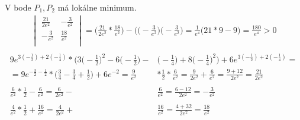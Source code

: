 \documentclass[a4paper]{article}
\begin{document}
		V bode $P_1, P_2$ má lokálne minimum.\\
		\begin{align*}
			\begin{vmatrix}
				\frac{21}{2e^2} & - \frac{3}{e^2}\\
				-\frac{3}{e^2} & \frac{18}{e^2}\\
			\end{vmatrix}
			= \bigg(\frac{21}{2e^2}*\frac{18}{e^2}\bigg) - \bigg(\bigg(- \frac{3}{e^2}\bigg)\bigg(- \frac{3}{e^2}\bigg) = \frac{1}{e^4}\bigg(21*9 - 9\bigg) = \frac{180}{e^4} > 0\\
		\end{align*}
		\begin{align*}
			9e^{3(-\frac{1}{2})+2(-\frac{1}{4})}*
			\bigg(3\bigg(-\frac{1}{2}\bigg)^2 - 6\bigg(-\frac{1}{2}\bigg)-&\bigg(-\frac{1}{4}\bigg)+
			8\bigg(-\frac{1}{4}\bigg)^2\bigg) + 
			6e^{3(-\frac{1}{2})+2(-\frac{1}{4})} = \\ =
			9e^{-\frac{3}{2}-\frac{1}{2}}*\bigg(\frac{3}{4}-\frac{3}{4}+\frac{1}{2}\bigg) + 6e^{-2} =
			\frac{9}{e^2}&*\frac{1}{2}*\frac{6}{e^2} = 
			\frac{9}{2e^2}+\frac{6}{e^2} = \frac{9+12}{2e^2} = \frac{21}{2e^2}\\
			\\
			\frac{6}{e^2} * \frac{1}{2} - \frac{6}{e^2} = \frac{6}{2e^2} -& \frac{6}{e^2} =
			\frac{6 - 12}{2e^2} = -\frac{3}{e^2}\\
			\\
			\frac{4}{e^2} * \frac{1}{2} + \frac{16}{e^2} = \frac{4}{2e^2} +& \frac{16}{e^2} = \frac{4 + 32}{2e^2} = \frac{18}{e^2}
		\end{align*}
	
	
\end{document}
